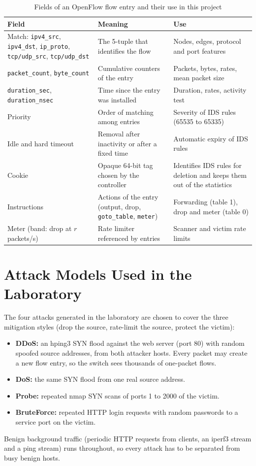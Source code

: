 \begin{table}[htbp]
\centering
\caption{Fields of an OpenFlow flow entry and their use in this project}
\label{tab:ofprimer}
\small
\begin{tabularx}{\textwidth}{|p{3.2cm}|X|p{3.6cm}|}
\hline
\textbf{Field} & \textbf{Meaning} & \textbf{Use} \\ \hline
Match: \texttt{ipv4\_src}, \texttt{ipv4\_dst}, \texttt{ip\_proto}, \texttt{tcp/udp\_src}, \texttt{tcp/udp\_dst} & The 5-tuple that identifies the flow & Nodes, edges, protocol and port features \\ \hline
\texttt{packet\_count}, \texttt{byte\_count} & Cumulative counters of the entry & Packets, bytes, rates, mean packet size \\ \hline
\texttt{duration\_sec}, \texttt{duration\_nsec} & Time since the entry was installed & Duration, rates, activity test \\ \hline
Priority & Order of matching among entries & Severity of IDS rules (65535 to 65335) \\ \hline
Idle and hard timeout & Removal after inactivity or after a fixed time & Automatic expiry of IDS rules \\ \hline
Cookie & Opaque 64-bit tag chosen by the controller & Identifies IDS rules for deletion and keeps them out of the statistics \\ \hline
Instructions & Actions of the entry (output, drop, \texttt{goto\_table}, \texttt{meter}) & Forwarding (table 1), drop and meter (table 0) \\ \hline
Meter (band: drop at $r$ packets/s) & Rate limiter referenced by entries & Scanner and victim rate limits \\ \hline
\end{tabularx}
\end{table}

\section{Attack Models Used in the Laboratory}
The four attacks generated in the laboratory are chosen to cover the three mitigation styles (drop the source, rate-limit the source, protect the victim):
\begin{itemize}
	\item \textbf{DDoS:} an hping3 SYN flood against the web server (port 80) with random spoofed source addresses, from both attacker hosts. Every packet may create a new flow entry, so the switch sees thousands of one-packet flows.
	\item \textbf{DoS:} the same SYN flood from one real source address.
	\item \textbf{Probe:} repeated nmap SYN scans of ports 1 to 2000 of the victim.
	\item \textbf{BruteForce:} repeated HTTP login requests with random passwords to a service port on the victim.
\end{itemize}
Benign background traffic (periodic HTTP requests from clients, an iperf3 stream and a ping stream) runs throughout, so every attack has to be separated from busy benign hosts.

